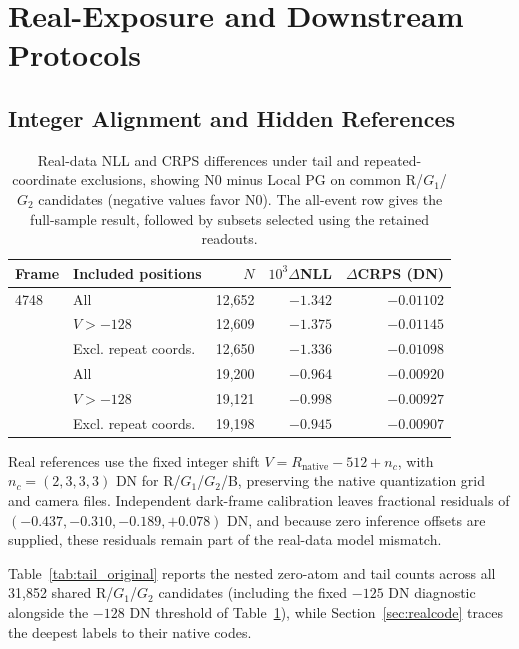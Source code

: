 \documentclass[10pt,twocolumn,journal]{IEEEtran}
\begin{document}
\section{Real-Exposure and Downstream Protocols}
\subsection{Integer Alignment and Hidden References}
\begin{table}[t]
\centering
\caption{Real-data NLL and CRPS differences under tail and repeated-coordinate exclusions, showing N0 minus Local PG on common R/$G_1$/$G_2$ candidates (negative values favor N0). The all-event row gives the full-sample result, followed by subsets selected using the retained readouts.}
\label{tab:real_robust}
\footnotesize
\setlength{\tabcolsep}{2.2pt}
\begin{tabular}{@{}llrrr@{}}
\toprule
Frame & Included positions & $N$ & $10^3\Delta$NLL & $\Delta$CRPS (DN)\\
\midrule
4748 & All & 12,652 & $-1.342$ & $-0.01102$\\
 & $V>-128$ & 12,609 & $-1.375$ & $-0.01145$\\
 & Excl. repeat coords. & 12,650 & $-1.336$ & $-0.01098$\\
\addlinespace[2pt]
4749 & All & 19,200 & $-0.964$ & $-0.00920$\\
 & $V>-128$ & 19,121 & $-0.998$ & $-0.00927$\\
 & Excl. repeat coords. & 19,198 & $-0.945$ & $-0.00907$\\
\bottomrule
\end{tabular}
\end{table}

Real references use the fixed integer shift $V=R_{\mathrm{native}}-512+n_c$, with $n_c=(2,3,3,3)$ DN for R/$G_1$/$G_2$/B, preserving the native quantization grid and camera files. Independent dark-frame calibration leaves fractional residuals of $(-0.437,-0.310,-0.189,+0.078)$ DN, and because zero inference offsets are supplied, these residuals remain part of the real-data model mismatch.

Table~\ref{tab:tail_original} reports the nested zero-atom and tail counts across all 31,852 shared R/$G_1$/$G_2$ candidates (including the fixed $-125$ DN diagnostic alongside the $-128$ DN threshold of Table~\ref{tab:real_robust}), while Section~\ref{sec:realcode} traces the deepest labels to their native codes.
\end{document}
